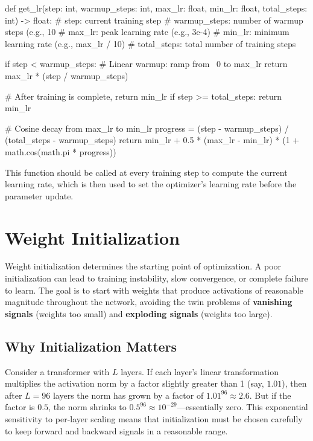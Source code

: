 \begin{pseudocode}
def get_lr(step: int, warmup_steps: int, max_lr: float,
           min_lr: float, total_steps: int) -> float:
    # step: current training step
    # warmup_steps: number of warmup steps (e.g., 10%
    # max_lr: peak learning rate (e.g., 3e-4)
    # min_lr: minimum learning rate (e.g., max_lr / 10)
    # total_steps: total number of training steps

    if step < warmup_steps:
        # Linear warmup: ramp from ~0 to max_lr
        return max_lr * (step / warmup_steps)

    # After training is complete, return min_lr
    if step >= total_steps:
        return min_lr

    # Cosine decay from max_lr to min_lr
    progress = (step - warmup_steps) / (total_steps - warmup_steps)
    return min_lr + 0.5 * (max_lr - min_lr) * (1 + math.cos(math.pi * progress))
\end{pseudocode}

This function should be called at every training step to compute the current learning rate, which is then used to set the optimizer's learning rate before the parameter update.

\section{Weight Initialization}

Weight initialization determines the starting point of optimization. A poor initialization can lead to training instability, slow convergence, or complete failure to learn. The goal is to start with weights that produce activations of reasonable magnitude throughout the network, avoiding the twin problems of \textbf{vanishing signals} (weights too small) and \textbf{exploding signals} (weights too large).

\subsection{Why Initialization Matters}

Consider a transformer with $L$ layers. If each layer's linear transformation multiplies the activation norm by a factor slightly greater than 1 (say, $1.01$), then after $L = 96$ layers the norm has grown by a factor of $1.01^{96} \approx 2.6$. But if the factor is $0.5$, the norm shrinks to $0.5^{96} \approx 10^{-29}$---essentially zero. This exponential sensitivity to per-layer scaling means that initialization must be chosen carefully to keep forward and backward signals in a reasonable range.

